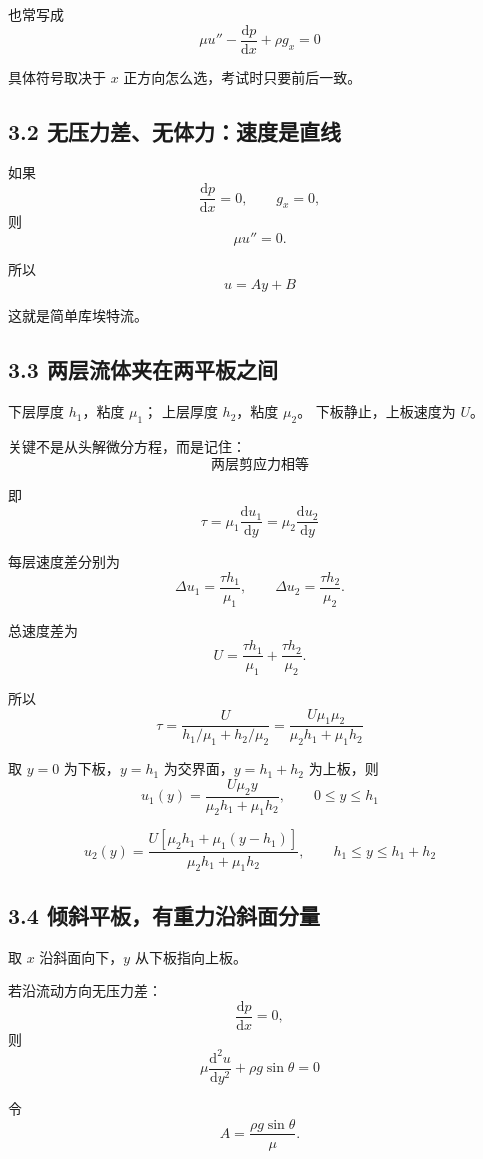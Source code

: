 ﻿\documentclass[12pt,a4paper]{ctexart}
\newcommand{\dd}{\mathrm d}
\begin{document}
也常写成
\[
\boxed{
\mu u''-\frac{\dd p}{\dd x}+\rho g_x=0
}
\]

具体符号取决于 \(x\) 正方向怎么选，考试时只要前后一致。

\subsection*{3.2 无压力差、无体力：速度是直线}

如果
\[
\frac{\dd p}{\dd x}=0,\qquad g_x=0,
\]
则
\[
\mu u''=0.
\]

所以
\[
\boxed{
u=Ay+B
}
\]

这就是简单库埃特流。

\subsection*{3.3 两层流体夹在两平板之间}

下层厚度 \(h_1\)，粘度 \(\mu_1\)；
上层厚度 \(h_2\)，粘度 \(\mu_2\)。
下板静止，上板速度为 \(U\)。

关键不是从头解微分方程，而是记住：
\[
\boxed{
\text{两层剪应力相等}
}
\]

即
\[
\boxed{
\tau=\mu_1\frac{\dd u_1}{\dd y}
=\mu_2\frac{\dd u_2}{\dd y}
}
\]

每层速度差分别为
\[
\Delta u_1=\frac{\tau h_1}{\mu_1},
\qquad
\Delta u_2=\frac{\tau h_2}{\mu_2}.
\]

总速度差为
\[
U=\frac{\tau h_1}{\mu_1}+\frac{\tau h_2}{\mu_2}.
\]

所以
\[
\boxed{
\tau=
\frac{U}{h_1/\mu_1+h_2/\mu_2}
=
\frac{U\mu_1\mu_2}{\mu_2h_1+\mu_1h_2}
}
\]

取 \(y=0\) 为下板，\(y=h_1\) 为交界面，\(y=h_1+h_2\) 为上板，则
\[
\boxed{
u_1(y)=\frac{U\mu_2y}{\mu_2h_1+\mu_1h_2},
\qquad 0\le y\le h_1
}
\]

\[
\boxed{
u_2(y)=
\frac{U\left[\mu_2h_1+\mu_1(y-h_1)\right]}
{\mu_2h_1+\mu_1h_2},
\qquad h_1\le y\le h_1+h_2
}
\]

\subsection*{3.4 倾斜平板，有重力沿斜面分量}

取 \(x\) 沿斜面向下，\(y\) 从下板指向上板。

若沿流动方向无压力差：
\[
\frac{\dd p}{\dd x}=0,
\]
则
\[
\boxed{
\mu\frac{\dd^2u}{\dd y^2}+\rho g\sin\theta=0
}
\]

令
\[
A=\frac{\rho g\sin\theta}{\mu}.
\]
\end{document}
